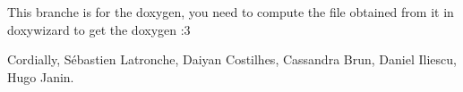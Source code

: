This branche is for the doxygen, you need to compute the file obtained from it in doxywizard to get the doxygen \+:3

Cordially, Sébastien Latronche, Daiyan Costilhes, Cassandra Brun, Daniel Iliescu, Hugo Janin. 